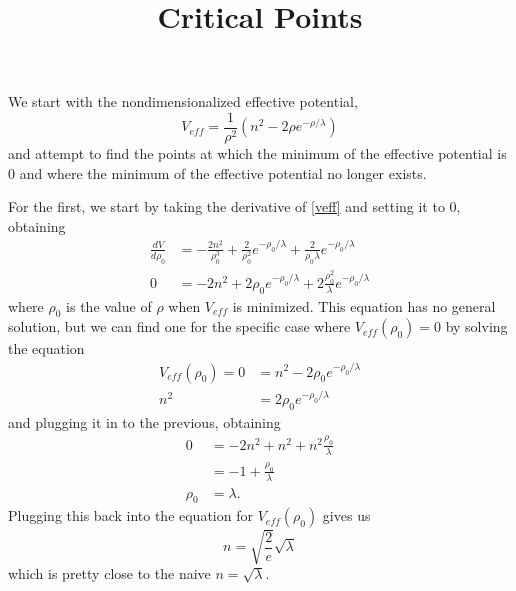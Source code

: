 \documentclass{article}
\title{Critical Points}
\begin{document}
\maketitle

We start with the nondimensionalized effective potential, 
\begin{equation}
V_{eff} = \frac{1}{\rho^2}\left( n^2 - 2\rho e^{-\rho/\lambda} \right)
\label{veff}
\end{equation}
and attempt to find the points at which the minimum of the effective potential is 0 and where the minimum of the effective potential no longer exists.

For the first, we start by taking the derivative of \eqref{veff} and setting it to 0, obtaining
\begin{align}
\frac{dV}{d\rho_0} &= -\frac{2n^2}{\rho_0^3} + \frac{2}{\rho_0^2}e^{-\rho_0/\lambda} + \frac{2}{\rho_0 \lambda} e^{-\rho_0/\lambda} \\
0 &= -2n^2 + 2\rho_0 e^{-\rho_0/\lambda} + 2\frac{\rho_0^2}{\lambda} e^{-\rho_0/\lambda}
\label{vmin}
\end{align}
where $\rho_0$ is the value of $\rho$ when $V_{eff}$ is minimized. This equation has no general solution, but we can find one for the specific case where $V_{eff}(\rho_0) = 0$ by solving the equation
\begin{align}
V_{eff}(\rho_0)=0 &= n^2 - 2\rho_0 e^{-\rho_0/\lambda} \\
n^2 &= 2 \rho_0 e^{-\rho_0/\lambda}
\end{align}
and plugging it in to the previous, obtaining
\begin{align}
0 &= -2n^2 + n^2 +n^2 \frac{\rho_0}{\lambda} \\
&= -1 + \frac{\rho_0}{\lambda} \\
\rho_0 &= \lambda \mbox{.}
\end{align}
Plugging this back into the equation for $V_{eff}(\rho_0)$ gives us
\begin{equation}
\mbox{$n = \sqrt{\frac{2}{e}}\sqrt{\lambda}$}
\end{equation}
which is pretty close to the naive $n = \sqrt{\lambda}$. 
\end{document}
